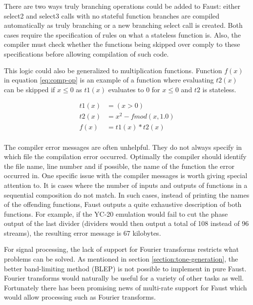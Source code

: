 \documentclass[11pt,a4paper]{article}
\begin{document}
There are two ways truly branching operations could be added to Faust: either select2 and select3 calls with no stateful function branches are compiled automatically as truly branching or a new branching select call is created. Both cases require the specification of rules on what a stateless function is. Also, the compiler must check whether the functions being skipped over comply to these specifications before allowing compilation of such code.

This logic could also be generalized to multiplication functions. Function $f(x)$ in equation \ref{eq:comp-op} is an example of a function where evaluating $t2(x)$ can be skipped if $x \leq 0$ as $t1(x)$ evaluates to 0 for $x \leq 0 $ and $t2$ is stateless.

\begin{equation}
\label{eq:comp-op}
\begin{split}
t1(x) &= (x>0) \\
t2(x) &= x^2-fmod(x,1.0) \\
f(x)  &= t1(x) * t2(x) \\
\end{split}
\end{equation}


The compiler error messages are often unhelpful. They do not always specify in which file the compilation error occurred. Optimally the compiler should identify the file name, line number and if possible, the name of the function the error occurred in. One specific issue with the compiler messages is worth giving special attention to. It is cases where the number of inputs and outputs of functions in a sequential composition do not match. In such cases, instead of printing the names of the offending functions, Faust outputs a quite exhaustive description of both functions. For example, if the YC-20 emulation would fail to cut the phase output of the last divider (dividers would then output a total of 108 instead of 96 streams), the resulting error message is 67 kilobytes.

For signal processing, the lack of support for Fourier transforms restricts what problems can be solved. As mentioned in section \ref{section:tone-generation}, the better band-limiting method (BLEP) is not possible to implement in pure Faust. Fourier transforms would naturally be useful for a variety of other tasks as well. Fortunately there has been promising news of multi-rate support for Faust which would allow processing such as Fourier transforms.
\end{document}
